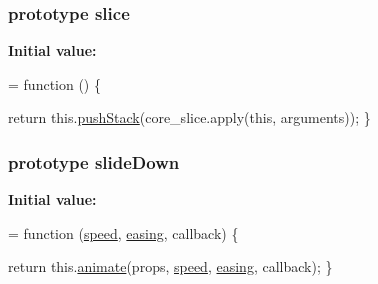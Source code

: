 \subsubsection[{\texorpdfstring{slice}{slice}}]{ {\bf prototype} slice}\hypertarget{jquery-2_82_81-vsdoc_8js_aea626f23fa5ea32b9d1c600d9c97d97d}{}\label{jquery-2_82_81-vsdoc_8js_aea626f23fa5ea32b9d1c600d9c97d97d}
{\bfseries Initial value\+:}
\begin{DoxyCode}
= \textcolor{keyword}{function} () \{
        

        \textcolor{keywordflow}{return} this.\hyperlink{jquery-2_82_81-vsdoc_8js_afc3a7db1ef2b526338c06c07cecccd44}{pushStack}(core\_slice.apply(\textcolor{keyword}{this}, arguments));
    \}
\end{DoxyCode}
\subsubsection[{\texorpdfstring{slide\+Down}{slideDown}}]{ {\bf prototype} slide\+Down}\hypertarget{jquery-2_82_81-vsdoc_8js_a9427ab906512c0f37fcb19a16acc9475}{}\label{jquery-2_82_81-vsdoc_8js_a9427ab906512c0f37fcb19a16acc9475}
{\bfseries Initial value\+:}
\begin{DoxyCode}
= \textcolor{keyword}{function} (\hyperlink{jquery-2_82_81-vsdoc_8js_add98c90065e6563cba26ff6d2016c46c}{speed}, \hyperlink{jquery-2_82_81-vsdoc_8js_a9758a312629fa6de1744280dd6e6253b}{easing}, callback) \{
        

        \textcolor{keywordflow}{return} this.\hyperlink{jquery-2_82_81-vsdoc_8js_a956a1d08128d41115c45b6815814a64d}{animate}(props, \hyperlink{jquery-2_82_81-vsdoc_8js_add98c90065e6563cba26ff6d2016c46c}{speed}, \hyperlink{jquery-2_82_81-vsdoc_8js_a9758a312629fa6de1744280dd6e6253b}{easing}, callback);
    \}
\end{DoxyCode}
